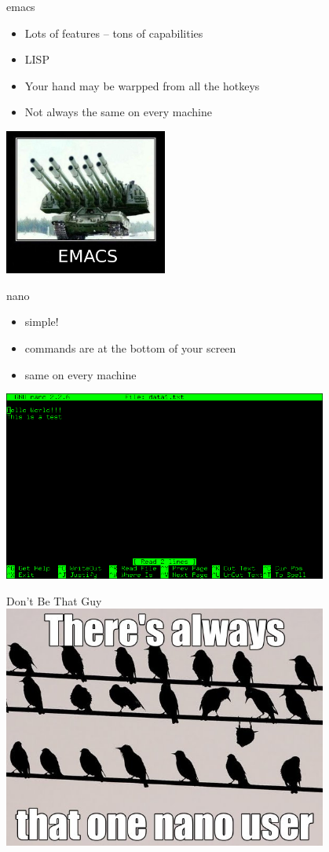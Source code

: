 \documentclass{beamer}
\begin{document}
\begin{frame}{emacs}
\begin{itemize}
\item Lots of features -- tons of capabilities
\item LISP
\item Your hand may be warpped from all the hotkeys
\item Not always the same on every machine
\end{itemize}
\begin{center}
\includegraphics[width=0.4\textwidth]{../imgs/emacs.png}
\end{center}
\end{frame}

\begin{frame}{nano}
\begin{itemize}
\item simple!
\item commands are at the bottom of your screen
\item same on every machine
\end{itemize}
\includegraphics[width=0.8\textwidth]{../imgs/nano.png}
\end{frame}

\begin{frame}{Don't Be That Guy}
\includegraphics[width=0.8\textwidth]{../imgs/meme-5660755493912576.png}
\end{frame}
\end{document}
